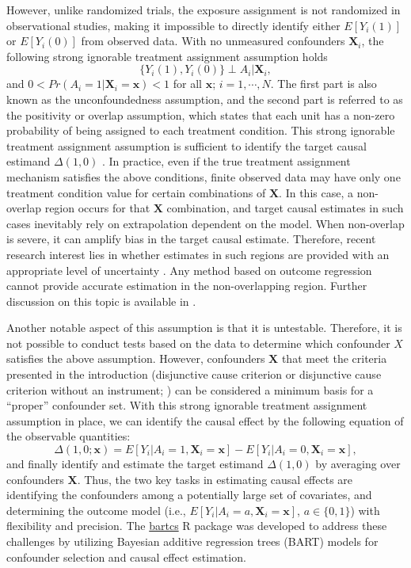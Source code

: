 However, unlike randomized trials, the exposure assignment is not randomized in observational studies, making it impossible to directly identify either $E[Y_i(1)]$ or $E[Y_i(0)]$ from observed data. With no unmeasured confounders $\boldsymbol{X}_i$, the following strong ignorable treatment assignment assumption \citep{rosenbaum_central_1983} holds
\[\{Y_i(1), Y_i(0)\} \perp A_i | \boldsymbol{X}_i, \]
and $0 < Pr(A_i=1 | \boldsymbol{X}_i=\boldsymbol{x}) < 1$ for all $\boldsymbol{x}$; $i=1, \cdots, N$.
The first part is also known as the unconfoundedness assumption, and the second part is referred to as the positivity or overlap assumption, which states that each unit has a non-zero probability of being assigned to each treatment condition. This strong ignorable treatment assignment assumption is sufficient to identify the target causal estimand $\Delta(1,0)$ \citep{rosenbaum_central_1983, ding2018causal, li2023bayesian}. In practice, even if the true treatment assignment mechanism satisfies the above conditions, finite observed data may have only one treatment condition value for certain combinations of $\boldsymbol{X}$. In this case, a non-overlap region occurs for that $\boldsymbol{X}$ combination, and target causal estimates in such cases inevitably rely on extrapolation dependent on the model. When non-overlap is severe, it can amplify bias in the target causal estimate. Therefore, recent research interest lies in whether estimates in such regions are provided with an appropriate level of uncertainty \citep{papadogeorgou2020invited,oganisian2020invited,li2023bayesian}. Any method based on outcome regression cannot provide accurate estimation in the non-overlapping region. Further discussion on this topic is available in \cite{li2023bayesian}.

Another notable aspect of this assumption is that it is untestable. Therefore, it is not possible to conduct tests based on the data to determine which confounder $X$ satisfies the above assumption. However, confounders $\boldsymbol{X}$ that meet the criteria presented in the introduction (disjunctive cause criterion or disjunctive cause criterion without an instrument; \citep{vanderweele2019principles}) can be considered a minimum basis for a ``proper'' confounder set. With this strong ignorable treatment assignment assumption in place, we can identify the causal effect by the following equation of the observable quantities:
\[\Delta(1, 0; \boldsymbol{x}) = E[Y_i|A_i=1, \boldsymbol{X}_i=\boldsymbol{x}]-E[Y_i|A_i=0, \boldsymbol{X}_i=\boldsymbol{x}],\]
and finally identify and estimate the target estimand $\Delta(1, 0)$ by averaging over confounders $\boldsymbol{X}$. Thus, the two key tasks in estimating causal effects are identifying the confounders among a potentially large set of covariates, and determining the outcome model (i.e., $E[Y_i|A_i=a, \boldsymbol{X}_i=\boldsymbol{x}]$, $a \in \{0, 1\}$) with flexibility and precision. The \href{https://CRAN.R-project.org/package=bartcs}{bartcs} R package was developed to address these challenges by utilizing Bayesian additive regression trees (BART) models for confounder selection and causal effect estimation.



